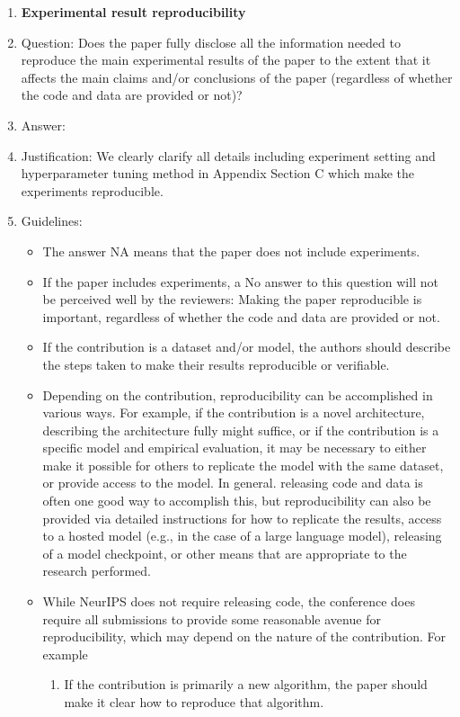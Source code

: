 \documentclass{article}
\theoremstyle{remark}
\begin{document}
\begin{enumerate}
    \item {\bf Experimental result reproducibility}
    \item[] Question: Does the paper fully disclose all the information needed to reproduce the main experimental results of the paper to the extent that it affects the main claims and/or conclusions of the paper (regardless of whether the code and data are provided or not)?
    \item[] Answer: \answerYes{} %
    \item[] Justification: We clearly clarify all details including experiment setting and hyperparameter tuning method in Appendix Section C which make the experiments reproducible.
    \item[] Guidelines:
    \begin{itemize}
        \item The answer NA means that the paper does not include experiments.
        \item If the paper includes experiments, a No answer to this question will not be perceived well by the reviewers: Making the paper reproducible is important, regardless of whether the code and data are provided or not.
        \item If the contribution is a dataset and/or model, the authors should describe the steps taken to make their results reproducible or verifiable. 
        \item Depending on the contribution, reproducibility can be accomplished in various ways. For example, if the contribution is a novel architecture, describing the architecture fully might suffice, or if the contribution is a specific model and empirical evaluation, it may be necessary to either make it possible for others to replicate the model with the same dataset, or provide access to the model. In general. releasing code and data is often one good way to accomplish this, but reproducibility can also be provided via detailed instructions for how to replicate the results, access to a hosted model (e.g., in the case of a large language model), releasing of a model checkpoint, or other means that are appropriate to the research performed.
        \item While NeurIPS does not require releasing code, the conference does require all submissions to provide some reasonable avenue for reproducibility, which may depend on the nature of the contribution. For example
        \begin{enumerate}
            \item If the contribution is primarily a new algorithm, the paper should make it clear how to reproduce that algorithm.

\end{enumerate}
\end{itemize}
\end{enumerate}
\end{document}
